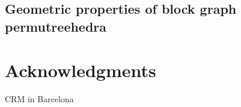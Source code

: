\documentclass{amsart}
\theoremstyle{definition}
\begin{document}

\subsection{Geometric properties of block graph permutreehedra}







\section*{Acknowledgments}

CRM in Barcelona 



\label{sec:biblio}
\end{document}
